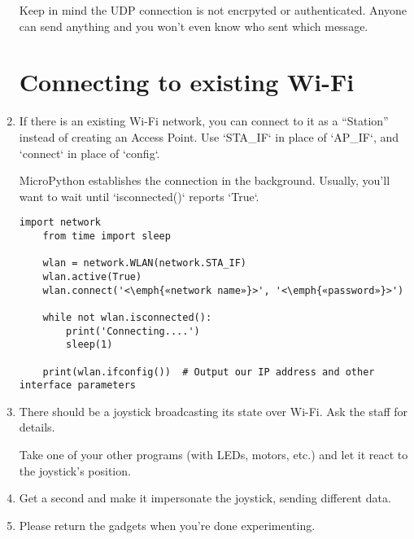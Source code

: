 \documentclass{../tutorial}
\begin{document}
\begin{enumerate}
    Keep in mind the UDP connection is not encrpyted or authenticated.
    Anyone can send anything and you won't even know who sent which message.

\section{Connecting to existing Wi-Fi}

\item
    If there is an existing Wi-Fi network, you can connect to it as a “Station”
    instead of creating an Access Point.
    Use `STA_IF` in place of `AP_IF`, and `connect` in place of `config`.

    MicroPython establishes the connection in the background.
    Usually, you'll want to wait until `isconnected()` reports `True`.

    \begin{lstlisting}[escapeinside=<>]
    import network
    from time import sleep

    wlan = network.WLAN(network.STA_IF)
    wlan.active(True)
    wlan.connect('<\emph{«network name»}>', '<\emph{«password»}>')

    while not wlan.isconnected():
        print('Connecting....')
        sleep(1)

    print(wlan.ifconfig())  # Output our IP address and other interface parameters
    \end{lstlisting}

\item
    There should be a joystick broadcasting its state over Wi-Fi.
    Ask the staff for details.

    Take one of your other programs (with LEDs, motors, etc.)
    and let it react to the joystick's position.

\item
    Get a second  and make it impersonate the joystick,
    sending different data.

\item
    Please return the gadgets when you're done experimenting.

\end{enumerate}
\end{document}
